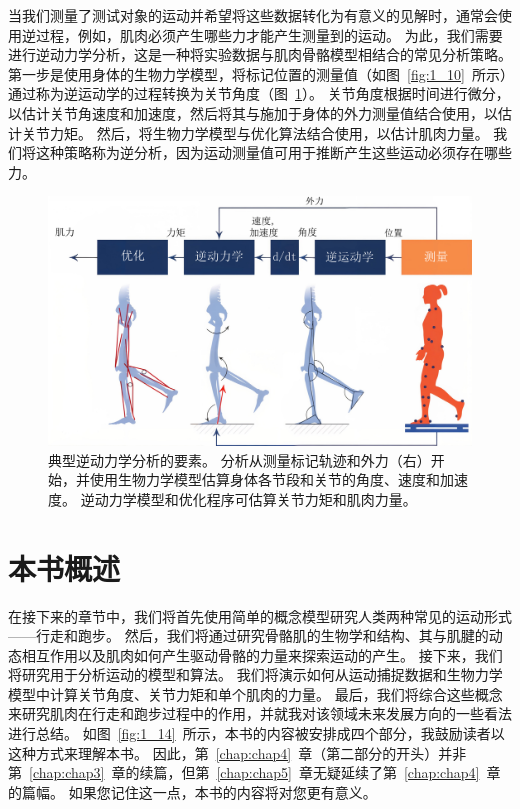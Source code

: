 当我们测量了测试对象的运动并希望将这些数据转化为有意义的见解时，通常会使用逆过程，例如，肌肉必须产生哪些力才能产生测量到的运动。
为此，我们需要进行逆动力学分析，这是一种将实验数据与肌肉骨骼模型相结合的常见分析策略。
第一步是使用身体的生物力学模型，将标记位置的测量值（如图~\ref{fig:1_10}~所示）通过称为逆运动学的过程转换为关节角度（图~\ref{fig:1_13}）。
关节角度根据时间进行微分，以估计关节角速度和加速度，然后将其与施加于身体的外力测量值结合使用，以估计关节力矩。
然后，将生物力学模型与优化算法结合使用，以估计肌肉力量。
我们将这种策略称为逆分析，因为运动测量值可用于推断产生这些运动必须存在哪些力。


\begin{figure}[!htb]
	\centering
	\includegraphics[width=1.0\linewidth]{chap1/1_13}
	\caption{典型逆动力学分析的要素。
		分析从测量标记轨迹和外力（右）开始，并使用生物力学模型估算身体各节段和关节的角度、速度和加速度。
		逆动力学模型和优化程序可估算关节力矩和肌肉力量。 \label{fig:1_13}}
\end{figure}




\section{本书概述}

在接下来的章节中，我们将首先使用简单的概念模型研究人类两种常见的运动形式——行走和跑步。
然后，我们将通过研究骨骼肌的生物学和结构、其与肌腱的动态相互作用以及肌肉如何产生驱动骨骼的力量来探索运动的产生。
接下来，我们将研究用于分析运动的模型和算法。
我们将演示如何从运动捕捉数据和生物力学模型中计算关节角度、关节力矩​​和单个肌肉的力量。
最后，我们将综合这些概念来研究肌肉在行走和跑步过程中的作用，并就我对该领域未来发展方向的一些看法进行总结。
如图~\ref{fig:1_14}~所示，本书的内容被安排成四个部分，我鼓励读者以这种方式来理解本书。
因此，第~\ref{chap:chap4}~章（第二部分的开头）并非第~\ref{chap:chap3}~章的续篇，但第~\ref{chap:chap5}~章无疑延续了第~\ref{chap:chap4}~章的篇幅。
如果您记住这一点，本书的内容将对您更有意义。


